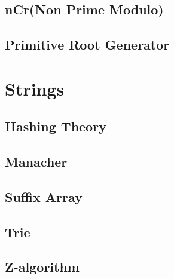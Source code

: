 \subsection{nCr(Non Prime Modulo)}
\raggedbottom
\hrulefill
\subsection{Primitive Root Generator}
\raggedbottom
\hrulefill

\section{Strings}
\subsection{Hashing Theory}
\raggedbottom
\hrulefill
\subsection{Manacher}
\raggedbottom
\hrulefill
\subsection{Suffix Array}
\raggedbottom
\hrulefill
\subsection{Trie}
\raggedbottom
\hrulefill
\subsection{Z-algorithm}
\raggedbottom
\hrulefill

